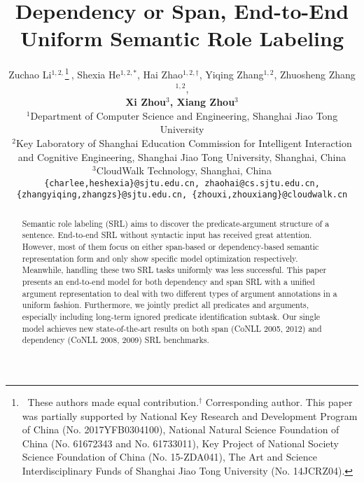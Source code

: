 \documentclass[letterpaper]{article} \usepackage{aaai19}  \usepackage{times}  \usepackage{helvet}  \usepackage{courier}  \usepackage{url}  \usepackage{graphicx}  \frenchspacing  \setlength{\pdfpagewidth}{8.5in}  \setlength{\pdfpageheight}{11in}
\begin{document}
\title{Dependency or Span, End-to-End Uniform Semantic Role Labeling}
\author{Zuchao Li$^{1,2,}$\thanks{$\ $ These authors made equal contribution.$^{\dag}$ Corresponding author. This paper was partially supported by National Key Research and Development Program of China (No. 2017YFB0304100), National Natural Science Foundation of China (No. 61672343 and No. 61733011), Key Project of National Society Science Foundation of China (No. 15-ZDA041), The Art and Science Interdisciplinary Funds of Shanghai Jiao Tong University (No. 14JCRZ04).}$\ $, Shexia He$^{1,2,*}$, Hai Zhao$^{1,2,\dag}$, Yiqing Zhang$^{1,2}$, Zhuosheng Zhang$^{1,2}$, 
	\\  \Large\textbf{Xi Zhou$^{3}$, Xiang Zhou$^{3}$}\\
	$^{1}$Department of Computer Science and Engineering, Shanghai Jiao Tong University \\
	$^{2}$Key Laboratory of Shanghai Education Commission for Intelligent Interaction \\ and Cognitive Engineering, Shanghai Jiao Tong University, Shanghai, China\\
	$^{3}$CloudWalk Technology, Shanghai, China\\
	{\tt \{charlee,heshexia\}@sjtu.edu.cn, zhaohai@cs.sjtu.edu.cn,}\\
	{\tt  \{zhangyiqing,zhangzs\}@sjtu.edu.cn, \{zhouxi,zhouxiang\}@cloudwalk.cn}\\
}
\maketitle
\begin{abstract}
Semantic role labeling (SRL) aims to discover the predicate-argument structure of a sentence. End-to-end SRL without syntactic input has received great attention. However, most of them focus on either span-based or dependency-based semantic representation form and only show specific model optimization respectively. Meanwhile, handling these two SRL tasks uniformly was less successful. This paper presents an end-to-end model for both dependency and span SRL with a unified argument representation to deal with two different types of argument annotations in a uniform fashion. Furthermore, we jointly predict all predicates and arguments, especially including long-term ignored predicate identification subtask. Our single model achieves new state-of-the-art results on both span (CoNLL 2005, 2012) and dependency (CoNLL 2008, 2009) SRL benchmarks. 
 
\end{abstract}
\end{document}
